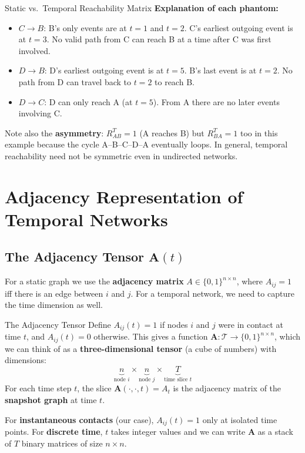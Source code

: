 \begin{examplebox}{Static vs.\ Temporal Reachability Matrix}
\textbf{Explanation of each phantom:}
\begin{itemize}[noitemsep]
  \item $C \to B$: B's only events are at $t=1$ and $t=2$. C's earliest outgoing event is at
        $t=3$. No valid path from C can reach B at a time after C was first involved.
  \item $D \to B$: D's earliest outgoing event is at $t=5$. B's last event is at $t=2$. No
        path from D can travel back to $t=2$ to reach B.
  \item $D \to C$: D can only reach A (at $t=5$). From A there are no later events involving
        C.
\end{itemize}

Note also the \textbf{asymmetry}: $R^T_{AB} = 1$ (A reaches B) but $R^T_{BA} = 1$ too in
this example because the cycle A--B--C--D--A eventually loops. In general, temporal
reachability need not be symmetric even in undirected networks.
\end{examplebox}

\section{Adjacency Representation of Temporal Networks}
\label{sec:adjacency_representation}

\subsection{The Adjacency Tensor $\mathbf{A}(t)$}

For a static graph we use the \textbf{adjacency matrix} $A \in \{0,1\}^{n \times n}$, where
$A_{ij} = 1$ iff there is an edge between $i$ and $j$. For a temporal network, we need to
capture the time dimension as well.

\begin{conceptbox}{The Adjacency Tensor}
Define $A_{ij}(t) = 1$ if nodes $i$ and $j$ were in contact at time $t$, and $A_{ij}(t) = 0$
otherwise. This gives a function $\mathbf{A} : \mathcal{T} \to \{0,1\}^{n \times n}$, which
we can think of as a \textbf{three-dimensional tensor} (a cube of numbers) with dimensions:
\[
  \underbrace{n}_{\text{node }i} \times \underbrace{n}_{\text{node }j} \times
  \underbrace{T}_{\text{time slice }t}
\]
For each time step $t$, the slice $\mathbf{A}(\cdot, \cdot, t) = A_t$ is the adjacency matrix
of the \textbf{snapshot graph} at time $t$.

For \textbf{instantaneous contacts} (our case), $A_{ij}(t) = 1$ only at isolated time points.
For \textbf{discrete time}, $t$ takes integer values and we can write $\mathbf{A}$ as a stack
of $T$ binary matrices of size $n \times n$.
\end{conceptbox}

